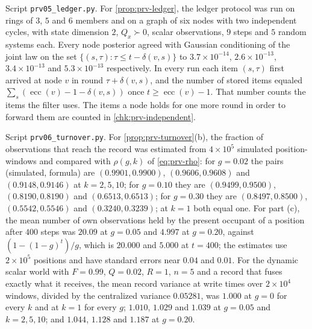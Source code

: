 \begin{numcheck}\label{chk:prv-ledger}
Script \texttt{prv05\_ledger.py}. For \cref{prop:prv-ledger}, the ledger protocol was run on rings of $3$, $5$ and $6$ members and on a graph of six nodes with two independent cycles, with state dimension $2$, $Q_x\succ0$, scalar observations, $9$ steps and $5$ random systems each. Every node posterior agreed with Gaussian conditioning of the joint law on the set $\{(s,\tau):\tau\le t-\delta(v,s)\}$ to $3.7\times10^{-14}$, $2.6\times10^{-13}$, $3.4\times10^{-13}$ and $5.3\times10^{-13}$ respectively. In every run each item $(s,\tau)$ first arrived at node $v$ in round $\tau+\delta(v,s)$, and the number of stored items equaled $\sum_s(\operatorname{ecc}(v)-1-\delta(v,s))$ once $t\ge\operatorname{ecc}(v)-1$. That number counts the items the filter uses. The items a node holds for one more round in order to forward them are counted in \cref{chk:prv-independent}.
\end{numcheck}

\begin{numcheck}[Turnover]\label{chk:prv-turnover}
Script \texttt{prv06\_turnover.py}. For \cref{prop:prv-turnover}(b), the fraction of observations that reach the record was estimated from $4\times10^{5}$ simulated position-windows and compared with $\rho(g,k)$ of \eqref{eq:prv-rho}: for $g=0.02$ the pairs (simulated, formula) are $(0.9901,0.9900)$, $(0.9606,0.9608)$ and $(0.9148,0.9146)$ at $k=2,5,10$; for $g=0.10$ they are $(0.9499,0.9500)$, $(0.8190,0.8190)$ and $(0.6513,0.6513)$; for $g=0.30$ they are $(0.8497,0.8500)$, $(0.5542,0.5546)$ and $(0.3240,0.3239)$; at $k=1$ both equal one. For part (c), the mean number of own observations held by the present occupant of a position after $400$ steps was $20.09$ at $g=0.05$ and $4.997$ at $g=0.20$, against $(1-(1-g)^t)/g$, which is $20.000$ and $5.000$ at $t=400$; the estimates use $2\times10^{5}$ positions and have standard errors near $0.04$ and $0.01$. For the dynamic scalar world with $F=0.99$, $Q=0.02$, $R=1$, $n=5$ and a record that fuses exactly what it receives, the mean record variance at write times over $2\times10^{4}$ windows, divided by the centralized variance $0.05281$, was $1.000$ at $g=0$ for every $k$ and at $k=1$ for every $g$; $1.010$, $1.029$ and $1.039$ at $g=0.05$ and $k=2,5,10$; and $1.044$, $1.128$ and $1.187$ at $g=0.20$.
\end{numcheck}

